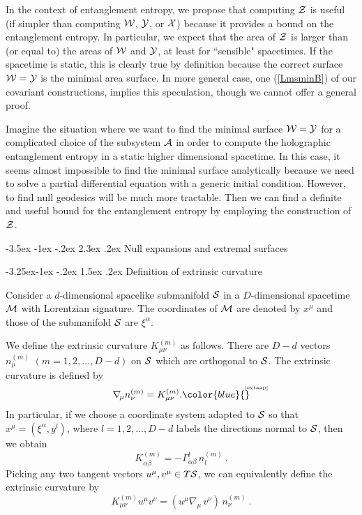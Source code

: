 \documentclass[12pt]{article}
\makeatletter
\renewcommand\section{\@startsection {section}{1}{\z@}%
                                   {-3.5ex \@plus -1ex \@minus -.2ex}%
                                   {2.3ex \@plus.2ex}%
                                   {\normalfont\large\bfseries}}
\renewcommand\subsection{\@startsection{subsection}{2}{\z@}%
                                     {-3.25ex\@plus -1ex \@minus -.2ex}%
                                     {1.5ex \@plus .2ex}%
                                     {\normalfont\bfseries}}
\newcommand{\be}{\begin{equation}}
\newcommand{\ee}{\end{equation}}
\def\req#1{(\ref{#1})}
\def\a{\alpha}
\def\CA{{\cal A}}
\def\CS{{\cal S}}
\def\CW{{\cal W}}
\def\CX{{\cal X}}
\def\CY{{\cal Y}}
\def\CZ{{\cal Z}}
\def\Label#1{\label{#1}%
{ \color{blue}{\smash{\hbox to0pt{\raise2ex\hbox{\tiny[#1]}\hss}}}}}
\def\bulk{{\cal M}}
\def\ms{\CS}
\def\Gms{\CW}
\def\Lms{\CY}
\def\Xms{\CX}
\def\Cms{\CZ}
\def\rA{\CA}
\def\ap{\alpha}
\makeatother
\begin{document}
In the context of entanglement entropy, we propose that computing
$\Cms$ is useful (if simpler than computing $\Gms$, $\Lms$, or
$\Xms$) because it provides a bound on the entanglement entropy. In
particular, we expect that the area of $\Cms$ is larger than (or
equal to) the areas of $\Gms$ and $\Lms$, at least for ``sensible"
spacetimes. If the spacetime is static, this is clearly true by
definition because the correct surface $\Gms=\Lms$ is the minimal
area surface. In more general case, one \req{LmsminB} of our
covariant constructions, implies this speculation, though we cannot
offer a general proof.

Imagine the situation where we want to find the minimal surface
$\Gms=\Lms$ for a complicated choice of the subsystem $\rA$ in order to
compute the holographic entanglement entropy in a static higher
dimensional spacetime. In this case, it seems almost impossible to
find the minimal surface analytically because we need to solve a
partial differential equation with a generic initial condition.
 However, to find null
geodesics will be much more tractable. Then we can find a definite
and useful bound for the entanglement entropy by employing the
construction of $\Cms$.


\section{Null expansions and extremal surfaces}
\label{apmin}


\subsection{Definition of extrinsic curvature}

Consider a $d$-dimensional spacelike submanifold $\ms$ in a
$D$-dimensional spacetime $\bulk$ with Lorentzian signature.
The coordinates of $\bulk$ are denoted by $x^\mu$ and those of the submanifold $\ms$ are $\xi^\a$.

We define the extrinsic curvature $K^{(m)}_{\mu\nu}$ as follows.
There are $D-d$ vectors  $n^{(m)}_\mu$ $(m=1,2,...,D-d)$ on $\ms$ which are
 orthogonal to $\ms$. The extrinsic curvature
is defined by
%
\be \nabla_{\! \mu}n^{(m)}_\nu=K^{(m)}_{\mu\nu}. \Label{extaap} \ee
%
In particular, if we choose
a coordinate system adapted to ${\cal S}$ so that
$x^\mu=(\xi^\ap,y^l)$, where $l=1,2,...,D-d$ labels the directions
normal to $\ms$, then we obtain
%
\be K^{(m)}_{\ap\beta}=-\Gamma^l_{\ap\beta}\, n^{(m)}_{l}\ . \ee
%
Picking  any two tangent vectors $u^\mu, v^\mu \in T\ms$, we
can equivalently define the extrinsic curvature by
%
\be K^{(m)}_{\mu\nu}u^\mu v^\nu=(u^\mu\nabla_{\! \mu} \, v^\nu)\,
n^{(m)}_\nu \ . \ee
%
\end{document}
